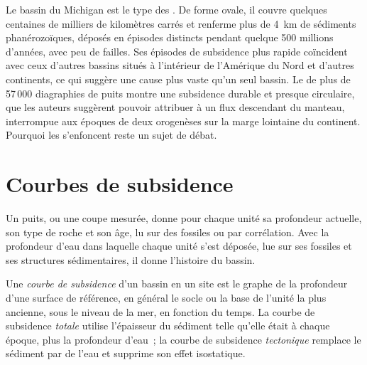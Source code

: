 Le bassin du Michigan est le type des . De forme ovale, il couvre quelques centaines de milliers
de kilomètres carrés et renferme plus de \qty{4}{km} de sédiments phanérozoïques, déposés en épisodes distincts
pendant quelque 500 millions d'années, avec peu de failles. Ses épisodes de subsidence plus rapide coïncident avec ceux
d'autres bassins situés à l'intérieur de l'Amérique du Nord et d'autres continents, ce qui suggère une cause plus vaste
qu'un seul bassin. Le  de plus de 57\,000 diagraphies de puits montre une subsidence
durable et presque circulaire, que les auteurs suggèrent pouvoir attribuer à un flux descendant du manteau,
interrompue aux époques de deux orogenèses sur la marge lointaine du continent. Pourquoi
les  s'enfoncent reste un sujet de débat.

\section{Courbes de subsidence}\label{sec:b2:basins-compared:curves}

Un puits, ou une coupe mesurée, donne pour chaque unité sa profondeur actuelle, son type de roche et son âge,
lu sur des fossiles ou par corrélation. Avec la profondeur d'eau dans laquelle chaque unité s'est déposée,
lue sur ses fossiles et ses structures sédimentaires, il donne l'histoire du bassin.

\begin{definition}\label{def:b2:basins-compared:curve}
Une \emph{courbe de subsidence} d'un bassin en un site est le graphe de la profondeur
d'une surface de référence, en général le socle ou la base de l'unité la plus ancienne, sous le niveau de la mer,
en fonction du temps. La courbe de subsidence \emph{totale} utilise l'épaisseur du sédiment telle qu'elle était à chaque
époque, plus la profondeur d'eau~; la courbe de subsidence \emph{tectonique} remplace le sédiment par de l'eau et
supprime son effet isostatique.
\end{definition}

